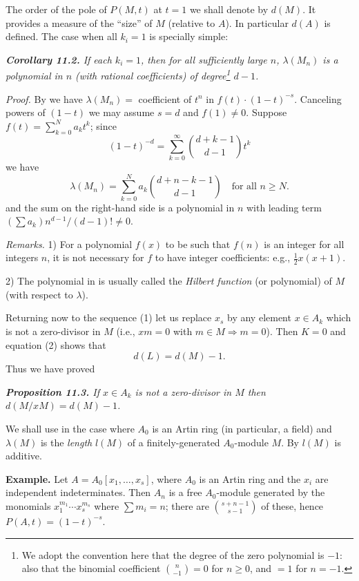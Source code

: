 The order of the pole of $P(M,t)$ at $t=1$ we shall denote by $d(M)$.  It
provides a measure of the ``size'' of $M$ (relative to $A$).  In particular $d(A)$ is
defined.  The case when all $k_i=1$ is specially simple:

\medskip
\noindent\textit{\textbf{Corollary 11.2.} If each $k_i=1$, then for all sufficiently large $n$, $\lambda(M_n)$ is a
polynomial in $n$ (with rational coefficients) of degree\footnote{We adopt the convention here that the degree of the zero polynomial is $-1$: also
that the binomial coefficient $\binom n{-1}=0$ for $n\geq0$, and $=1$ for $n=-1$.} $d-1$.}

\noindent\emph{Proof.}  By  we have $\lambda(M_n)={}$ coefficient of $t^n$ in $f(t)\cdot(1-t)^{-s}$.  Canceling powers of $(1-t)$ we may assume $s=d$ and $f(1)\ne0$.  Suppose $f(t)=
\sum_{k=0}^N a_kt^k$; since
\[
(1-t)^{-d}=\sum_{k=0}^\infty\binom{d+k-1}{d-1}t^k
\]
we have
\[
\lambda(M_n)=\sum_{k=0}^Na_k\binom{d+n-k-1}{d-1}\quad\text{for all }n\geq N.
\]
and the sum on the right-hand side is a polynomial in $n$ with leading term
$(\sum a_k)n^{d-1}/(d-1)!\ne0$.\proofbox

\emph{Remarks.}  1) For a polynomial $f(x)$ to be such that $f(n)$ is an integer for all
integers $n$, it is not necessary for $f$ to have integer coefficients: e.g., $\frac12x(x+1)$.

2) The polynomial in  is usually called the \emph{Hilbert function} (or polynomial) of $M$ (with respect to $\lambda$).

Returning now to the sequence (1) let us replace $x_s$ by any element $x\in A_k$
which is not a zero-divisor in $M$ (i.e., $xm=0$ with $m\in M\Rightarrow m=0$).  Then
$K=0$ and equation (2) shows that
\[
d(L)=d(M)-1.
\]
Thus we have proved

\medskip
\noindent\textit{\textbf{Proposition 11.3.} If $x\in A_k$ is not a zero-divisor in $M$ then $d(M/xM)=
d(M)-1$.}\proofbox

We shall use  in the case where $A_0$ is an Artin ring (in particular, a
field) and $\lambda(M)$ is the \emph{length} $l(M)$ of a finitely-generated $A_0$-module $M$.  By
 $l(M)$ is additive.

\noindent\textbf{Example.}  Let $A=A_0[x_1,\ldots,x_s]$, where $A_0$ is an Artin ring and the $x_i$ are
independent indeterminates.  Then $A_n$ is a free $A_0$-module generated by the
monomials $x_1^{m_1}\cdots x_s^{m_s}$ where $\sum m_i=n$; there are $\binom{s+n-1}{s-1}$ of these, hence
$P(A,t)=(1-t)^{-s}$.

